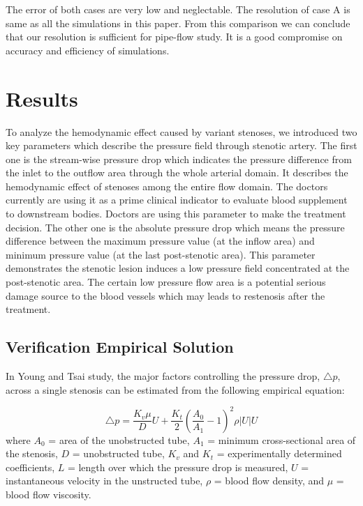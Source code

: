 The error of both cases are very low and neglectable. The resolution of case A is same as all the simulations in this paper. From this comparison we can conclude that our resolution is sufficient for pipe-flow study. It is a good compromise on accuracy and efficiency of simulations.

\section{Results}

To analyze the hemodynamic effect caused by variant stenoses, we introduced two key parameters which describe the pressure field through stenotic artery. 
The first one is the  stream-wise pressure drop which indicates the pressure difference from the inlet to the outflow area through the whole arterial domain.  
It describes the hemodynamic effect of stenoses among the entire flow domain. The doctors currently are using it as a prime clinical indicator to evaluate blood supplement to downstream bodies. Doctors are using this parameter to make the treatment decision.
The other one is the absolute pressure drop which means the pressure difference between the maximum pressure value (at the inflow area) and minimum pressure value (at the last post-stenotic area). 
This parameter demonstrates the stenotic lesion induces a low pressure field concentrated at the post-stenotic area. 
The certain low pressure flow area is a potential serious damage source to the blood vessels which may leads to restenosis after the treatment. 

\subsection{Verification Empirical Solution}

In Young and Tsai\cite{Young&Tsai} study, the major factors controlling the pressure drop, $\triangle p$, across a single stenosis can be estimated from the following empirical equation:

\begin{equation}
\triangle p = \frac{K_v \mu}{D} U + \frac{K_t}{2}(\frac{A_0}{A_1} -1)^2 \rho \lvert U \rvert U %
\end{equation}
where $A_0$ = area of the unobstructed tube, $A_1$ = minimum cross-sectional area of the stenosis,
$D$ = unobstructed tube, $K_v$ and $K_t$ = experimentally determined coefficients, 
$L$ = length over which the pressure drop is measured, $U$ = instantaneous velocity in the unstructed tube,
$\rho$ = blood flow density, and $\mu$ = blood flow viscosity. 

